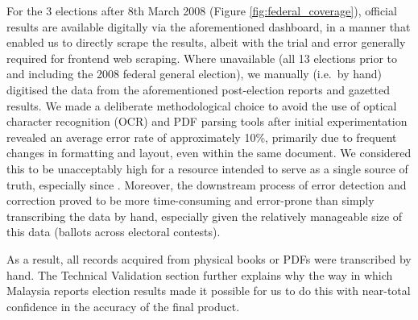 \documentclass[11pt]{article}
\begin{document}
\begin{figure}[htbp]
\end{figure}

For the 3 elections after 8th March 2008 (Figure \ref{fig:federal_coverage}), official results are available digitally via the aforementioned dashboard, in a manner that enabled us to directly scrape the results, albeit with the trial and error generally required for frontend web scraping. Where unavailable (all 13 elections prior to and including the 2008 federal general election), we manually (i.e.\ by hand) digitised the data from the aforementioned post-election reports and gazetted results. We made a deliberate methodological choice to avoid the use of optical character recognition (OCR) and PDF parsing tools after initial experimentation revealed an average error rate of approximately 10\%, primarily due to frequent changes in formatting and layout, even within the same document. We considered this to be unacceptably high for a resource intended to serve as a single source of truth, especially since . Moreover, the downstream process of error detection and correction proved to be more time-consuming and error-prone than simply transcribing the data by hand, especially given the relatively manageable size of this data (\TOTALBALLOTS\space ballots across \TOTALCONTESTS\space electoral contests). 

As a result, all records acquired from physical books or PDFs were transcribed by hand. The Technical Validation section further explains why the way in which Malaysia reports election results made it possible for us to do this with near-total confidence in the accuracy of the final product.
\end{document}
